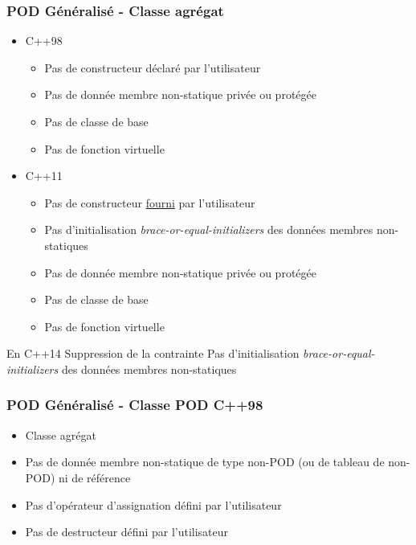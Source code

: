 \documentclass[C++.tex]{subfiles}
\begin{document}
\begin{frame}[fragile]
	\frametitle{POD Généralisé - Classe agrégat}
	\begin{itemize}
		\item C++98
		\begin{itemize}
			\item Pas de constructeur déclaré par l'utilisateur
			\item Pas de donnée membre non-statique privée ou protégée
			\item Pas de classe de base
			\item Pas de fonction virtuelle
		\end{itemize}
		\item C++11
		\begin{itemize}
			\item Pas de constructeur \underline{fourni} par l'utilisateur


			\item Pas d'initialisation \textit{brace-or-equal-initializers} des données membres non-statiques
			\item Pas de donnée membre non-statique privée ou protégée
			\item Pas de classe de base
			\item Pas de fonction virtuelle
		\end{itemize}
	\end{itemize}

	\begin{block}{En C++14}
		Suppression de la contrainte \og Pas d'initialisation \textit{brace-or-equal-initializers} des données membres non-statiques\fg{}
	\end{block}
\end{frame}

\begin{frame}[fragile]
	\frametitle{POD Généralisé - Classe POD C++98}
	\begin{itemize}
		\item Classe agrégat
		\item Pas de donnée membre non-statique de type non-POD (ou de tableau de non-POD) ni de référence
		\item Pas d'opérateur d'assignation défini par l'utilisateur
		\item Pas de destructeur défini par l'utilisateur
	\end{itemize}
\end{frame}
\end{document}
